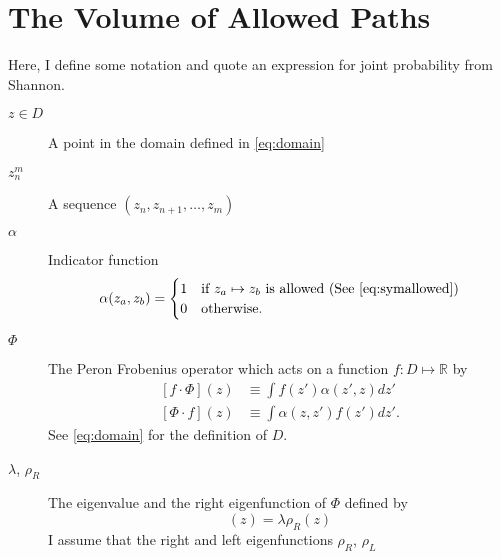 \documentclass[twocolumn]{article}
\newcommand{\field}[1]{\mathbb{#1}}
\newcommand\REAL{\field{R}}
\begin{document}
\section{The Volume of Allowed Paths}
\label{sec:volume}

Here, I define some notation and quote an expression for joint
probability from Shannon.%
\newcommand{\tuple}[2]{z_{#1}^{#2}}%
\newcommand{\allowed}{\alpha}%
\newcommand{\preimage}{\tau}%
\newcommand{\scale}[1]{\psi_{#1}}%
\newcommand{\stationary}{\mu}%
\newcommand{\pair}{\beta}%
\newcommand{\ptuple}[1]{\gamma_{#1}}%
\newcommand{\Skip}[1]{\delta_{#1}}%
\newcommand{\PFop}{\Phi} %
\newcommand{\pfop}{\phi} %
\newcommand{\lefunc}{\rho_L}%
\newcommand{\refunc}{\rho_R}%
\newcommand{\eval}{\lambda}
\newcommand{\suparg}[1]{^{[#1]}}
\newcommand{\supn}{\suparg{n}}
\begin{description}
\item[$z\in D$] A point in the domain defined in \eqref{eq:domain}
\item[$\tuple{n}{m}$] A sequence $(z_n, z_{n+1}, \ldots, z_m)$
\item[$\allowed$] Indicator function
  \begin{equation*}
    \allowed(z_a,z_b) =
    \begin{cases}
      1 & \text{if }z_a \mapsto z_b
      \text{ is allowed (See \eqref{eq:symallowed})}\\
      0 & \text{otherwise}.
    \end{cases}
  \end{equation*}
\item[$\PFop$] The Peron Frobenius operator which acts on a
  function $f:D\mapsto \REAL$ by
  \begin{subequations}
    \label{eq:PFop}
    \begin{align}
      \left[f \cdot \PFop \right] (z) &\equiv \int f(z') \allowed(z',z)
      dz' \\
      \left[ \PFop \cdot f \right] (z) &\equiv \int \allowed(z,z')
      f(z') dz'.
    \end{align}
  \end{subequations}
  See \eqref{eq:domain} for the definition of $D$. 
\item[$\eval$, $\refunc$] The eigenvalue and the right eigenfunction
  of $\PFop$ defined by
  \begin{equation*}
    [\PFop \cdot \refunc] (z) = \eval \refunc(z)
  \end{equation*}
  I assume that the right and left eigenfunctions $\refunc$, $\lefunc$

\end{description}
\end{document}
